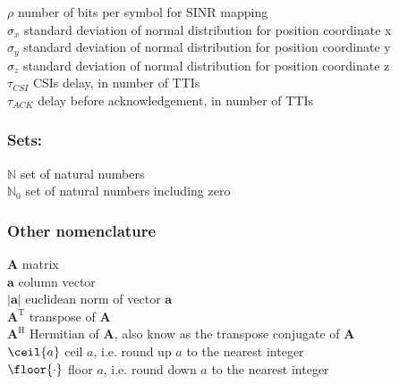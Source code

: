 $\rho$ \mytab number of bits per symbol for SINR mapping\\

$\sigma_x$ \mytab standard deviation of normal distribution for position coordinate x \\
$\sigma_y$ \mytab standard deviation of normal distribution for position coordinate y \\
$\sigma_z$ \mytab standard deviation of normal distribution for position coordinate z \\




$\tau_{CSI}$ \mytab \acsp{CSI} delay, in number of \acsp{TTI} \\
$\tau_{ACK}$ \mytab delay before acknowledgement, in number of \acsp{TTI} \\








\subsubsection*{Sets:}

$\mathbb{N}$ \mytab set of natural numbers \\
$\mathbb{N}_0$ \mytab set of natural numbers including zero\\





\subsubsection*{Other nomenclature}


$\bm{A}$ \mytab matrix\\

$\bm{a}$ \mytab column vector\\

$|\bm{a}|$ \mytab euclidean norm of vector $\bm{a}$\\

$\bm{A}^\text{T}$ \mytab transpose of $\bm{A}$\\
$\bm{A}^\text{H}$ \mytab Hermitian of $\bm{A}$, also know as the transpose conjugate of $\bm{A}$\\

$\ceil{a}$ \mytab ceil $a$, i.e. round up $a$ to the nearest integer\\

$\floor{\cdot}$ \mytab floor $a$, i.e. round down $a$ to the nearest integer \\








\clearpage
\thispagestyle{empty}


\cleardoublepage
 \setcounter{page}{1}
\baselineskip 18pt